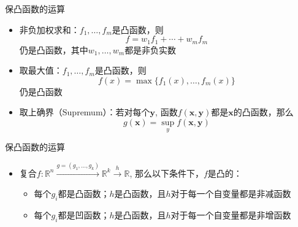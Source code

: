 \begin{frame}

\begin{block}{保凸函数的运算}
\begin{itemize}
\item 非负加权求和：$f_1,\ldots,f_m$是凸函数，则
$$f = w_1f_1+\cdots+w_mf_m$$
仍是凸函数，其中$w_1,\ldots,w_m$都是非负实数
\item 取最大值：$f_1,\ldots,f_m$是凸函数，则
$$f(x) = \max\{f_1(x),\ldots,f_m(x)\}$$
仍是凸函数
\item 取上确界（Supremum）：若对每个$\mathbf{y}$, 函数$f(\mathbf{x}, \mathbf{y})$都是$\mathbf{x}$的凸函数，那么
$$g(\mathbf{x}) = \sup\limits_{y} f(\mathbf{x}, \mathbf{y})$$
\end{itemize}
\end{block}

\end{frame}


\begin{frame}

\begin{block}{保凸函数的运算}
\begin{itemize}
\item 复合$f: \mathbb{R}^n \xrightarrow{g = (g_1,\ldots,g_k)} \mathbb{R}^k \xrightarrow{h} \mathbb{R}$, 那么以下条件下，$f$是凸的：
\begin{itemize}
\item[$\bullet$] 每个$g_i$都是凸函数；$h$是凸函数，且$h$对于每一个自变量都是非减函数
\item[$\bullet$] 每个$g_i$都是凹函数；$h$是凸函数，且$h$对于每一个自变量都是非增函数
\end{itemize}

\end{itemize}
\end{block}

\end{frame}


